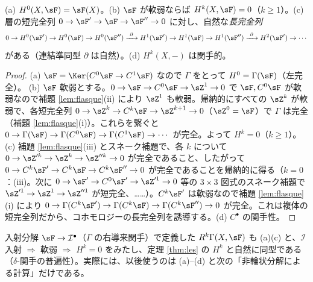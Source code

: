 \begin{thm}[基本性質]\label{thm:les}\tP
(a) $H^0(X,\sF)=\sF(X)$。(b) $\sF$ が軟弱ならば $H^k(X,\sF)=0$（$k\ge1$）。(c) 層の短完全列 $0\to\sF'\to\sF\to\sF''\to0$ に対し、自然な\emph{長完全列}
\[
0\to H^0(\sF')\to H^0(\sF)\to H^0(\sF'')\xrightarrow{\ \partial\ }H^1(\sF')\to H^1(\sF)\to H^1(\sF'')\xrightarrow{\ \partial\ }H^2(\sF')\to\cdots
\]
がある（連結準同型 $\partial$ は自然）。(d) $H^k(X,-)$ は関手的。
\end{thm}
\begin{proof}
(a) $\sF=\Ker(C^0\sF\to C^1\sF)$ なので $\Gamma$ をとって $H^0=\Gamma(\sF)$（左完全）。
(b) $\sF$ 軟弱とする。$0\to\sF\to C^0\sF\to\sZ^1\to0$ で $\sF,C^0\sF$ が軟弱なので補題 \ref{lem:flasque}(ii) により $\sZ^1$ も軟弱。帰納的にすべての $\sZ^k$ が軟弱で、各短完全列 $0\to\sZ^k\to C^k\sF\to\sZ^{k+1}\to0$（$\sZ^0=\sF$）で $\Gamma$ は完全（補題 \ref{lem:flasque}(i)）。これらを繋ぐと $0\to\Gamma(\sF)\to\Gamma(C^0\sF)\to\Gamma(C^1\sF)\to\cdots$ が完全。よって $H^k=0$（$k\ge1$）。
(c) 補題 \ref{lem:flasque}(iii) とスネーク補題で、各 $k$ について $0\to\sZ'^k\to\sZ^k\to\sZ''^k\to0$ が完全であること、したがって $0\to C^k\sF'\to C^k\sF\to C^k\sF''\to0$ が完全であることを帰納的に得る（$k=0$：(iii)。次に $0\to\sF'\to C^0\sF'\to\sZ'^1\to0$ 等の $3\times3$ 図式のスネーク補題で $\sZ'^1\to\sZ^1\to\sZ''^1$ が短完全、……）。$C^k\sF'$ は軟弱なので補題 \ref{lem:flasque}(i) により $0\to\Gamma(C^k\sF')\to\Gamma(C^k\sF)\to\Gamma(C^k\sF'')\to0$ が完全。これは複体の短完全列だから、コホモロジーの長完全列を誘導する。(d) $C^\bullet$ の関手性。\qedhere
\end{proof}
\begin{rem}[他の定義との関係]\tC
入射分解 $\sF\to\mathcal I^\bullet$（$\Gamma$ の右導来関手）で定義した $R^k\Gamma(X,\sF)$ も (a)(c) と、$\mathcal I$ 入射 $\Rightarrow$ 軟弱 $\Rightarrow$ $H^k=0$ をみたし、定理 \ref{thm:les} の $H^k$ と自然に同型である（$\delta$-関手の普遍性）。実際には、以後使うのは (a)--(d) と次の「非輪状分解による計算」だけである。
\end{rem}

